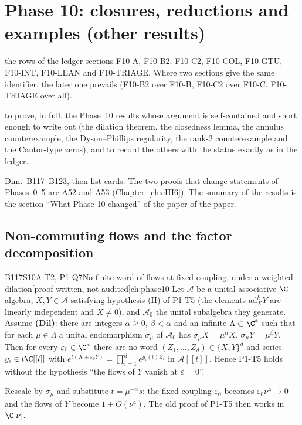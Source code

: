 \documentclass[11pt,a4paper,oneside]{report}
\newcommand{\chapterbrief}[3]{\begin{leadin}\begin{description}[itemsep=3pt,leftmargin=3.1cm,labelwidth=2.9cm,font=\sffamily\bfseries\small]
  \item[Starting from] #1
  \item[Why] #2
  \item[Role] #3
  \end{description}\end{leadin}}
\newcommand{\badge}[2]{\textcolor{#1}{\textsf{\footnotesize[#2]}}}
\newcommand{\pw}{\badge{cD}{proof written, not audited}}
\newenvironment{dimcard}[5]{\par\Needspace{12\baselineskip}\begin{dimcardbox}{#1}{#2}{#3}{#4}{#5}}{\end{dimcardbox}}
\begin{document}
\chapter[Phase 10 closures]{Phase 10: closures, reductions and examples (other results)}\label{ch:cIV4}
\chapterbrief
{the rows of the ledger sections F10-A, F10-B2, F10-C2, F10-COL, F10-GTU, F10-INT, F10-LEAN and F10-TRIAGE. Where two sections give the same identifier, the later one prevails (F10-B2 over F10-B, F10-C2 over F10-C, F10-TRIAGE over all).}
{to prove, in full, the Phase~10 results whose argument is self-contained and short enough to write out (the dilation theorem, the closedness lemma, the annulus counterexample, the Dyson--Phillips regularity, the rank-$2$ counterexample and the Cantor-type zeros), and to record the others with the status exactly as in the ledger.}
{Dim.~B117--B123, then list cards. The two proofs that change statements of Phases~0--5 are A52 and A53 (Chapter~\ref{ch:cIII6}). The summary of the results is the section ``What Phase 10 changed'' of the paper of the paper.}

\section{Non-commuting flows and the factor decomposition}

\begin{dimcard}{B117}{S10A-T2, P1-Q7}{No finite word of flows at fixed coupling, under a weighted dilation}{\pw}{ch:phase10}
Let $\mathcal A$ be a unital associative $\C$-algebra, $X,Y\in\mathcal A$ satisfying hypothesis (H) of P1-T5 (the elements $\mathrm{ad}_X^kY$ are linearly independent and $X\ne0$), and $\mathcal A_0$ the unital subalgebra they generate. Assume \textbf{(Dil)}: there are integers $\alpha\ge0$, $\beta<\alpha$ and an infinite $\Lambda\subset\C^*$ such that for each $\mu\in\Lambda$ a unital endomorphism $\sigma_\mu$ of $\mathcal A_0$ has $\sigma_\mu X=\mu^\alpha X$, $\sigma_\mu Y=\mu^\beta Y$. Then for every $\varepsilon_0\in\C^*$ there are no word $(Z_1,\dots,Z_d)\in\{X,Y\}^d$ and series $g_i\in t\C[[t]]$ with $e^{t(X+\varepsilon_0Y)}=\prod_{i=1}^de^{g_i(t)Z_i}$ in $\mathcal A[[t]]$. Hence P1-T5 holds without the hypothesis ``the flows of $Y$ vanish at $\varepsilon=0$''.
\end{dimcard}

\begin{proofidea}
Rescale by $\sigma_\mu$ and substitute $t=\mu^{-\alpha}s$: the fixed coupling $\varepsilon_0$ becomes $\varepsilon_0\nu^{\mathfrak a}\to0$ and the flows of $Y$ become $1+O(\nu^{\mathfrak a})$. The old proof of P1-T5 then works in $\C[\nu]$.
\end{proofidea}
\end{document}
